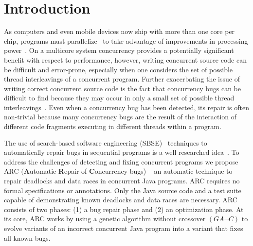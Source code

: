 \documentclass[runningheads,a4paper]{llncs}
\begin{document}
 \section{Introduction}
\label{sec:introduction}

As computers and even mobile devices now ship with more than one core per chip, programs must parallelize~ to take advantage of improvements in processing power~\cite{SL05}. %
On a multicore system concurrency provides a potentially significant benefit with respect to performance, however, writing concurrent source code can be difficult and error-prone, especially when one considers the set of possible thread interleavings of a concurrent program. Further exacerbating the issue of writing correct concurrent source code is the fact that concurrency bugs can be difficult to find because they may occur in only a small set of possible thread interleavings~\cite{MQB07}. Even when a concurrency bug has been detected, its repair is often non-trivial because many concurrency bugs are the result of the interaction of different code fragments executing in different threads within a program. 

The use of search-based software engineering (SBSE)~\cite{Har+10} techniques to automatically repair bugs in sequential programs is a well researched idea~\cite{WNLF09, LDFW12}. To address the challenges of detecting and fixing concurrent programs we propose ARC (\textbf{A}utomatic \textbf{R}epair of \textbf{C}oncurrency bugs) -- an automatic technique to repair deadlocks and data races in concurrent Java programs. ARC requires no formal specifications or annotations. Only the Java source code and a test suite capable of demonstrating known deadlocks and data races are necessary. ARC consists of two phases: (1) a bug repair phase and (2) an optimization phase. At its core, ARC works by using a genetic algorithm without crossover $(GA \neg C)$ to evolve variants of an incorrect concurrent Java program into a variant that fixes all known bugs. 
\end{document}
